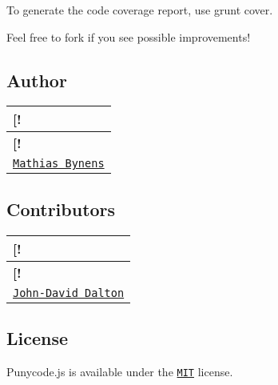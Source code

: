To generate the code coverage report, use {\ttfamily grunt cover}.

Feel free to fork if you see possible improvements!

\subsection*{Author}

\tabulinesep=1mm
\begin{longtabu} spread 0pt [c]{*{1}{|X[-1]}|}
\hline
\rowcolor{\tableheadbgcolor}\textbf{ \mbox{[}!   }\\
\endfirsthead
\hline
\endfoot
\hline
\rowcolor{\tableheadbgcolor}\textbf{ \mbox{[}!   }\\
\endhead
\href{https://mathiasbynens.be/}{\tt Mathias Bynens}   \\
\end{longtabu}


\subsection*{Contributors}

\tabulinesep=1mm
\begin{longtabu} spread 0pt [c]{*{1}{|X[-1]}|}
\hline
\rowcolor{\tableheadbgcolor}\textbf{ \mbox{[}!   }\\
\endfirsthead
\hline
\endfoot
\hline
\rowcolor{\tableheadbgcolor}\textbf{ \mbox{[}!   }\\
\endhead
\href{http://allyoucanleet.com/}{\tt John-\/\+David Dalton}   \\
\end{longtabu}


\subsection*{License}

Punycode.\+js is available under the \href{https://mths.be/mit}{\tt M\+IT} license. 